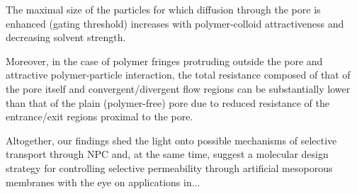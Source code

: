 \documentclass[12pt, a4paper]{article}
\begin{document}
The maximal size of the particles for which diffusion through the pore is enhanced (gating threshold) increases with polymer-colloid attractiveness and decreasing solvent strength.

Moreover, in the case of polymer fringes protruding outside the pore and attractive polymer-particle interaction, the total resistance composed of that of the pore itself 
and convergent/divergent flow regions can be substantially lower than that of the plain (polymer-free) pore due to reduced resistance of the entrance/exit regions proximal to the pore.

Altogether, our findings shed the light onto possible mechanisms of selective transport through NPC and, at the same time, suggest a molecular design strategy for controlling selective
permeability through artificial mesoporous membranes with the eye on applications in...


\printbibliography
\end{document}
